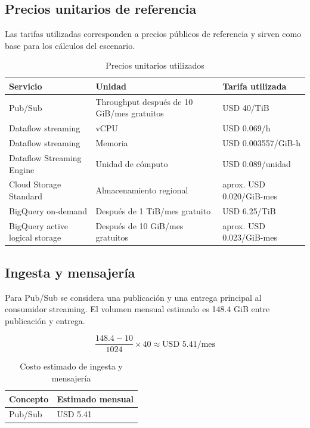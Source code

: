 \documentclass[11pt,a4paper]{article}
\begin{document}
\subsection{Precios unitarios de referencia}
Las tarifas utilizadas corresponden a precios públicos de referencia y sirven como base para los cálculos del escenario.

\begin{table}[H]
\caption{Precios unitarios utilizados}\label{tab:precios-gcp-costos}
\small
\begin{tabularx}{\linewidth}{@{}P{.25\linewidth}P{.40\linewidth}Y@{}}\toprule
Servicio & Unidad & Tarifa utilizada\\\midrule
Pub/Sub & Throughput después de 10 GiB/mes gratuitos & USD 40/TiB\\
Dataflow streaming & vCPU & USD 0.069/h\\
Dataflow streaming & Memoria & USD 0.003557/GiB-h\\
Dataflow Streaming Engine & Unidad de cómputo & USD 0.089/unidad\\
Cloud Storage Standard & Almacenamiento regional & aprox. USD 0.020/GiB-mes\\
BigQuery on-demand & Después de 1 TiB/mes gratuito & USD 6.25/TiB\\
BigQuery active logical storage & Después de 10 GiB/mes gratuitos & aprox. USD 0.023/GiB-mes\\\bottomrule
\end{tabularx}
\end{table}

\subsection{Ingesta y mensajería}
Para Pub/Sub se considera una publicación y una entrega principal al consumidor streaming. El volumen mensual estimado es 148.4 GiB entre publicación y entrega.

\[
\frac{148.4-10}{1024}\times 40 \approx \text{USD }5.41/\text{mes}
\]

\begin{table}[H]
\caption{Costo estimado de ingesta y mensajería}\label{tab:costo-pubsub}
\small
\begin{tabularx}{\linewidth}{@{}XY@{}}\toprule
Concepto & Estimado mensual\\\midrule
Pub/Sub & USD 5.41\\\bottomrule
\end{tabularx}
\end{table}
\end{document}
